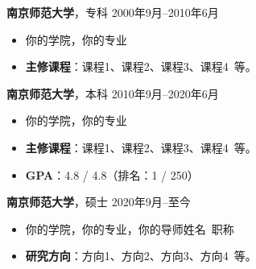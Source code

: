 \documentclass[11pt]{article} %
\begin{document}
\begin{minipage}[t]{0.78\textwidth}
\begin{minipage}[t]{\textwidth}
        {\large \textbf{南京师范大学}}，专科 \hfill 2000年9月--2010年6月
        \begin{itemize} %
            \item 你的学院，你的专业
            \item \textbf{主修课程}：课程1、课程2、课程3、课程4\ 等。
        \end{itemize}

        \vspace{0.5em} %
        {\large \textbf{南京师范大学}}，本科 \hfill 2010年9月--2020年6月
        \begin{itemize}
            \item 你的学院，你的专业
            \item \textbf{主修课程}：课程1、课程2、课程3、课程4\ 等。
            \item \textbf{GPA}：4.8 / 4.8（排名：1 / 250）
        \end{itemize}

        \vspace{0.5em}
        {\large \textbf{南京师范大学}}，硕士 \hfill 2020年9月--至今
        \begin{itemize}
            \item 你的学院，你的专业，你的导师姓名\ 职称
            \item \textbf{研究方向}：方向1、方向2、方向3、方向4\ 等。
        \end{itemize}

        \vspace{1.2em} %
        \end{minipage}
    \end{minipage} %
    \hfill %
\end{document}
